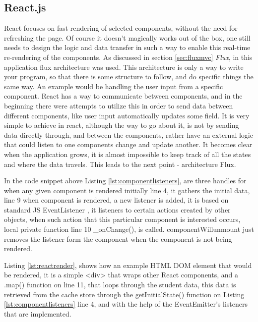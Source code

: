 \subsection{React.js}
React focuses on fast rendering of selected components, without the need for refreshing the page. Of course it doesn't magically works out of the box, one still needs to design the logic and data transfer in such a way to enable this real-time re-rendering of the components. As discussed in section \ref{sec:fluxmvc} \emph{Flux}, in this application flux architecture was used. This architecture is only a way to write your program, so that there is some structure to follow, and do specific things the same way. An example would be handling the user input from a specific component. React has a way to communicate between components, and in the beginning there were attempts to utilize this in order to send data between different components, like user input automatically updates some field. It is very simple to achieve in react, although the way to go about it, is not by sending data directly through, and between the components, rather have an external logic that could listen to one components change and update another. It becomes clear when the application grows, it is almost impossible to keep track of all the states and where the data travels. This leads to the next point - architecture Flux.



In the code snippet above Listing \ref{lst:componentlisteners}, are three handles for when any given component  is rendered initially line 4, it gathers the initial data, line 9 when component is rendered, a new listener is added, it is based on standard JS EventListener \cite{eventlistener}, it listeners to certain actions created by other objects, when such action that this particular component is interested occurs, local private function line 10 \_onChange(), is called. componentWillunmount just removes the listener form the component when the component is not being rendered.




Listing \ref{lst:reactrender}, shows how an example HTML DOM element that would be rendered, it is a simple <div> that wraps other React components, and a .map() function on line 11, that loops through the student data, this data is retrieved from the cache store through the getInitialState() function on Listing \ref{lst:componentlisteners} line 4, and with the help of the EventEmitter's listeners that are implemented.

